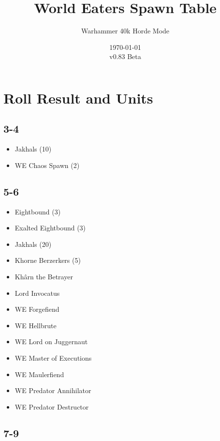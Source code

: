 \documentclass{HordeModeTarot}
\title{World Eaters Spawn Table}
\author{Warhammer 40k Horde Mode}
\date{\today \\v0.83 Beta}
\begin{document}
\maketitle

\outputUsingSpawnTableBoilerplate
\section{Roll Result and Units}\hypertarget{roll-results}{}\label{roll-results}

\begin{multicols}{2}

\subsection*{3-4}

\begin{itemize}[leftmargin=*]
\item[] Jakhals (10)
\item[] WE Chaos Spawn (2)
\end{itemize}

\subsection*{5-6}

\begin{itemize}[leftmargin=*]
\item[] Eightbound (3)
\item[] Exalted Eightbound (3)
\item[] Jakhals (20)
\item[] Khorne Berzerkers (5)
\item[] Khârn the Betrayer
\item[] Lord Invocatus
\item[] WE Forgefiend
\item[] WE Hellbrute
\item[] WE Lord on Juggernaut
\item[] WE Master of Executions
\item[] WE Maulerfiend
\item[] WE Predator Annihilator
\item[] WE Predator Destructor
\end{itemize}

\subsection*{7-9}


\end{multicols}
\end{document}
